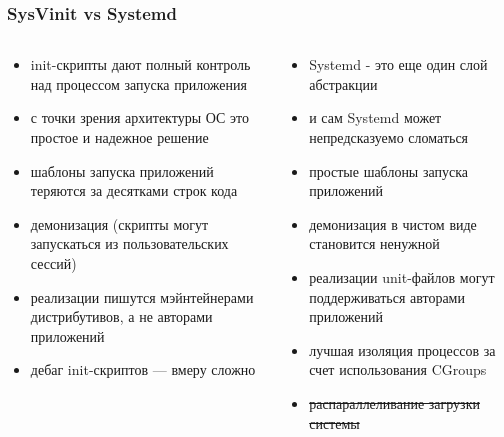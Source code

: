 \documentclass[aspectratio=169]{beamer}
\begin{document}
\begin{frame}
  \frametitle{SysVinit vs Systemd}

  \begin{columns}
    \begin{column}{.5\textwidth}
      \begin{itemize}
        \item init-скрипты дают полный контроль над процессом запуска приложения
        \item с точки зрения архитектуры ОС это простое и надежное решение
        \item шаблоны запуска приложений теряются за десятками строк кода
        \item демонизация (скрипты могут запускаться из пользовательских сессий)
        \item реализации пишутся мэйнтейнерами дистрибутивов, а не авторами приложений
        \item дебаг init-скриптов --- вмеру сложно
      \end{itemize}
    \end{column}

    \begin{column}{.5\textwidth}
      \begin{itemize}
        \item Systemd - это еще один слой абстракции
        \item и сам Systemd может непредсказуемо сломаться
        \item простые шаблоны запуска приложений
        \item демонизация в чистом виде становится ненужной
        \item реализации unit-файлов могут поддерживаться авторами приложений
        \item лучшая изоляция процессов за счет использования CGroups
        \item \sout{распараллеливание загрузки системы}
      \end{itemize}
    \end{column}
  \end{columns}

\end{frame}
\end{document}
